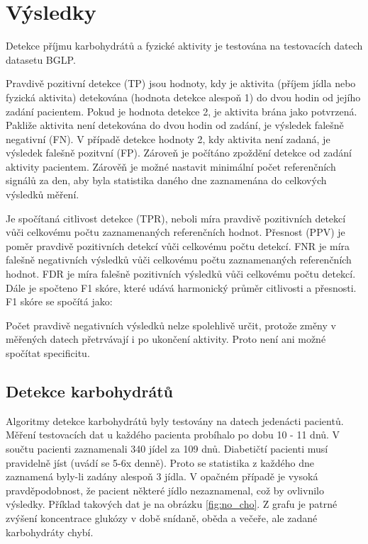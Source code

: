 \chapter{Výsledky}

Detekce příjmu karbohydrátů a fyzické aktivity je testována na testovacích datech datasetu BGLP.

Pravdivě pozitivní detekce (TP) jsou hodnoty, kdy je aktivita (příjem jídla nebo fyzická aktivita) detekována (hodnota detekce alespoň 1) do dvou hodin od jejího zadání pacientem. Pokud je hodnota detekce 2, je aktivita brána jako potvrzená. Pakliže aktivita není detekována do dvou hodin od zadání, je výsledek falešně negativní (FN). V případě detekce hodnoty 2, kdy aktivita není zadaná, je výsledek falešně pozitvní (FP). Zároveň je počítáno zpoždění detekce od zadání aktivity pacientem. Zárověň je možné nastavit minimální počet referenčních signálů za den, aby byla statistika daného dne zaznamenána do celkových výsledků měření.

Je spočítaná citlivost detekce (TPR), neboli míra pravdivě pozitivních detekcí vůči celkovému počtu zaznamenaných referenčních hodnot. Přesnost (PPV) je poměr pravdivě pozitivních detekcí vůči celkovému počtu detekcí. FNR je míra falešně negativních výsledků vůči celkovému počtu zaznamenaných referenčních hodnot. FDR je míra falešně pozitivních výsledků vůči celkovému počtu detekcí. Dále je spočteno F1 skóre, které udává harmonický průměr citlivosti a přesnosti. F1 skóre se spočítá jako:


Počet pravdivě negativních výsledků nelze spolehlivě určit, protože změny v měřených datech přetrvávají i po ukončení aktivity. Proto není ani možné spočítat specificitu.

\section{Detekce karbohydrátů}

Algoritmy detekce karbohydrátů byly testovány na datech jedenácti pacientů. Měření testovacích dat u každého pacienta probíhalo po dobu 10 - 11 dnů. V součtu pacienti zaznamenali 340 jídel za 109 dnů. Diabetičtí pacienti musí pravidelně jíst (uvádí se 5-6x denně). Proto se statistika z každého dne zaznamená byly-li zadány alespoň 3 jídla. V opačném případě je vysoká pravděpodobnost, že pacient některé jídlo nezaznamenal, což by ovlivnilo výsledky. Příklad takových dat je na obrázku \ref{fig:no_cho}. Z grafu je patrné zvýšení koncentrace glukózy v době snídaně, oběda a večeře, ale zadané karbohydráty chybí.\enlargethispage{\baselineskip}

